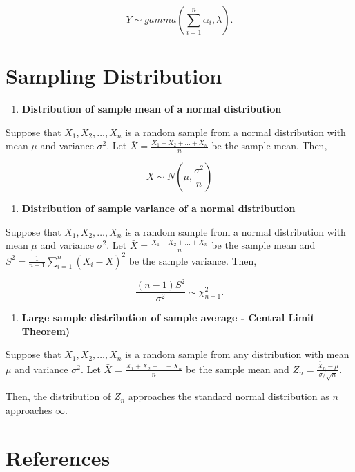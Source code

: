 \documentclass[]{book}
\providecommand{\tightlist}{%
  \setlength{\itemsep}{0pt}\setlength{\parskip}{0pt}}
\begin{document}
\[Y \sim gamma\left(\sum_{i=1}^n\alpha_i, \lambda\right).\]

\hypertarget{sampling-distribution}{%
\section{Sampling Distribution}\label{sampling-distribution}}

\begin{enumerate}
\def\labelenumi{\arabic{enumi}.}
\tightlist
\item
  \textbf{Distribution of sample mean of a normal distribution}
\end{enumerate}

Suppose that \(X_1, X_2, \dots, X_n\) is a random sample from a normal distribution with mean \(\mu\) and variance \(\sigma^2\). Let \(\bar{X} = \frac{X_1+X_2+\dots + X_n}{n}\) be the sample mean. Then,

\[\bar{X} \sim N\left(\mu, \frac{\sigma^2}{n}\right)\]

\begin{enumerate}
\def\labelenumi{\arabic{enumi}.}
\setcounter{enumi}{1}
\tightlist
\item
  \textbf{Distribution of sample variance of a normal distribution}
\end{enumerate}

Suppose that \(X_1, X_2, \dots, X_n\) is a random sample from a normal distribution with mean \(\mu\) and variance \(\sigma^2\). Let \(\bar{X} = \frac{X_1+X_2+\dots + X_n}{n}\) be the sample mean and \(S^2 = \frac{1}{n-1}\sum_{i=1}^n(X_i-\bar{X})^2\) be the sample variance. Then,

\[\frac{(n-1)S^2}{\sigma^2} \sim \chi^2_{n-1}.\]

\begin{enumerate}
\def\labelenumi{\arabic{enumi}.}
\setcounter{enumi}{2}
\tightlist
\item
  \textbf{Large sample distribution of sample average - Central Limit Theorem)}
\end{enumerate}

Suppose that \(X_1, X_2, \dots, X_n\) is a random sample from any distribution with mean \(\mu\) and variance \(\sigma^2\). Let \(\bar{X} = \frac{X_1+X_2+\dots + X_n}{n}\) be the sample mean and \(Z_n = \frac{\bar{X}_n-\mu}{\sigma/\sqrt{n}}.\)

Then, the distribution of \(Z_n\) approaches the standard normal distribution as \(n\) approaches \(\infty.\)

\hypertarget{references}{%
\section*{References}\label{references}}
\end{document}
